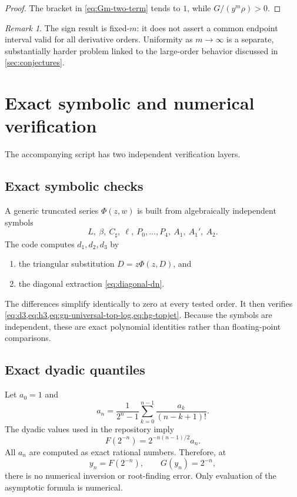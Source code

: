 \documentclass[11pt,oneside]{article}
\numberwithin{equation}{section}
\theoremstyle{definition}
\theoremstyle{remark}
\newtheorem{remark}[theorem]{Remark}
\newcommand{\Csharp}{C_{\sharp}}
\begin{document}
\begin{proof}
The bracket in \cref{eq:Gm-two-term} tends to $1$, while $G/(y^m\rho)>0$.
\end{proof}

\begin{remark}
The sign result is fixed-$m$: it does not assert a common endpoint interval valid for all derivative orders.  Uniformity as $m\to\infty$ is a separate, substantially harder problem linked to the large-order behavior discussed in \cref{sec:conjectures}.
\end{remark}

\section{Exact symbolic and numerical verification}
\label{sec:numerics}

The accompanying script  has two independent verification layers.

\subsection{Exact symbolic checks}
A generic truncated series $\Phi(z,w)$ is built from algebraically independent symbols
\[
 L,\ \beta,\ \Csharp,\ \ell,\ P_0,\ldots,P_4,\ A_1,\ A_1',\ A_2.
\]
The code computes $d_1,d_2,d_3$ by
\begin{enumerate}
\item the triangular substitution $D=z\Phi(z,D)$, and
\item the diagonal extraction \cref{eq:diagonal-dn}.
\end{enumerate}
The differences simplify identically to zero at every tested order.  It then verifies \cref{eq:d3,eq:h3,eq:gn-universal-top-log,eq:hg-topjet}.  Because the symbols are independent, these are exact polynomial identities rather than floating-point comparisons.

\subsection{Exact dyadic quantiles}
Let $a_0=1$ and
\begin{equation}
 a_n=\frac1{2^n-1}\sum_{k=0}^{n-1}\frac{a_k}{(n-k+1)!}.
 \label{eq:dyadic-an}
\end{equation}
The dyadic values used in the repository imply
\begin{equation}
 F(2^{-n})=2^{-n(n-1)/2}a_n.
 \label{eq:dyadic-F}
\end{equation}
All $a_n$ are computed as exact rational numbers.  Therefore, at
\begin{equation}
 y_n=F(2^{-n}),
 \qquad G(y_n)=2^{-n},
 \label{eq:exact-test-points}
\end{equation}
there is no numerical inversion or root-finding error.  Only evaluation of the asymptotic formula is numerical.
\end{document}
